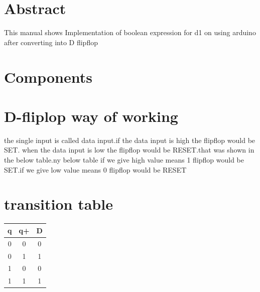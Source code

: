 \documentclass[10pt, a4paper]{article}
\begin{document}
 \section{Abstract}
This manual shows Implementation of boolean expression for d1 on using arduino after converting into D flipflop
\section{Components}
\begin{table}[ht]
\caption{}
\label{Tabel-1}
\end{table}
\section{D-fliplop way of working}
the single input is called data input.if the data input is high the flipflop would be SET. when the data input is low the flipflop would be RESET.that was shown in the below table.ny below table if we give high value means 1 flipflop would be SET.if we give low value means 0 flipflop would be RESET
\section{transition table}

    \centering
    \begin{tabular}{ |c |c |c |}
\hline
\newline
\textbf{q} & \textbf{q+}  & \textbf{D} \\
\hline
 0 & 0  &0 \\  
 0 & 1  &1 \\ 
 1 & 0  &0 \\ 
 1 & 1  &1 \\ 
 
 \hline
 \end{tabular}
\end{document}
